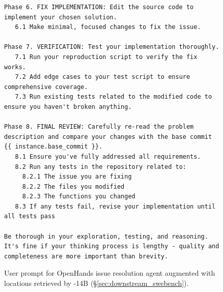 \begin{figure}[!ht]
    \centering
\begin{tcolorbox}[colback=blue!6!white, colframe=blue!45!white, title={\small User Prompt for OpenHands Issue Resolution Agent Augmented with Locations Retrieved by \methodname-14B (continued)}]
\begin{lstlisting}[basicstyle=\fontsize{7.7}{8}\ttfamily]
Phase 6. FIX IMPLEMENTATION: Edit the source code to implement your chosen solution.
   6.1 Make minimal, focused changes to fix the issue.

Phase 7. VERIFICATION: Test your implementation thoroughly.
   7.1 Run your reproduction script to verify the fix works.
   7.2 Add edge cases to your test script to ensure comprehensive coverage.
   7.3 Run existing tests related to the modified code to ensure you haven't broken anything.

Phase 8. FINAL REVIEW: Carefully re-read the problem description and compare your changes with the base commit {{ instance.base_commit }}.
   8.1 Ensure you've fully addressed all requirements.
   8.2 Run any tests in the repository related to:
     8.2.1 The issue you are fixing
     8.2.2 The files you modified
     8.2.3 The functions you changed
   8.3 If any tests fail, revise your implementation until all tests pass

Be thorough in your exploration, testing, and reasoning. It's fine if your thinking process is lengthy - quality and completeness are more important than brevity.
\end{lstlisting}
\end{tcolorbox}
\caption{User prompt for OpenHands issue resolution agent augmented with locations retrieved by \methodname-14B (\S\ref{sec:downstream_swebench}).
\label{fig:user_prompt_codescout_augment2}
}
\end{figure}

